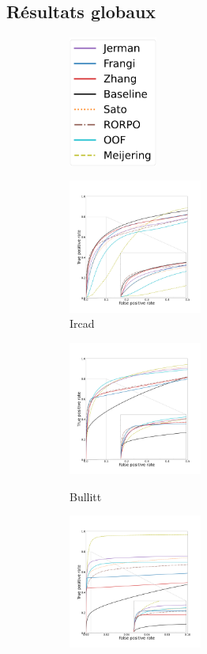 \subsection{Résultats globaux}

\begin{figure}[!ht]
  \centering
  \begin{subfigure}[t]{\textwidth}
    \includegraphics[clip = true, height=43mm]{Images/standAloneLegend.pdf}
  \end{subfigure}
  \begin{subfigure}[t]{\textwidth}
  \includegraphics[clip = true, trim  =  125 125 180 260, width=44mm]{Images/Ircad_ROC.pdf}
  \caption{Ircad}
\end{subfigure}
  \begin{subfigure}[t]{\textwidth}
  \includegraphics[clip = true, trim  =  125 125 180 200, width=44mm]{Images/Bullitt_ROC.pdf} \\
  \caption{Bullitt}
\end{subfigure}
  \begin{subfigure}[t]{\textwidth}
  \includegraphics[clip = true, trim  =  125 125 100 200, width=44mm]{Images/Vascu_2_ROC.pdf}

\end{subfigure}
\end{figure}
